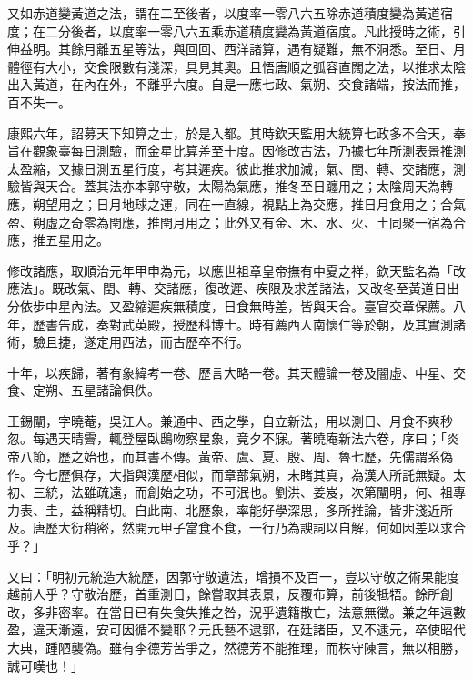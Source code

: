 \begin{pinyinscope}
又如赤道變黃道之法，謂在二至後者，以度率一零八六五除赤道積度變為黃道宿度；在二分後者，以度率一零八六五乘赤道積度變為黃道宿度。凡此授時之術，引伸益明。其餘月離五星等法，與回回、西洋諸算，遇有疑難，無不洞悉。至日、月體徑有大小，交食限數有淺深，具見其奧。且悟唐順之弧容直闊之法，以推求太陰出入黃道，在內在外，不離乎六度。自是一應七政、氣朔、交食諸端，按法而推，百不失一。

康熙六年，詔募天下知算之士，於是入都。其時欽天監用大統算七政多不合天，奉旨在觀象臺每日測驗，而金星比算差至十度。因修改古法，乃據七年所測表景推測太盈縮，又據日測五星行度，考其遲疾。彼此推求加減，氣、閏、轉、交諸應，測驗皆與天合。蓋其法亦本郭守敬，太陽為氣應，推冬至日躔用之；太陰周天為轉應，朔望用之；日月地球之運，同在一直線，視點上為交應，推日月食用之；合氣盈、朔虛之奇零為閏應，推閏月用之；此外又有金、木、水、火、土同聚一宿為合應，推五星用之。

修改諸應，取順治元年甲申為元，以應世祖章皇帝撫有中夏之祥，欽天監名為「改應法」。既改氣、閏、轉、交諸應，復改遲、疾限及求差諸法，又改冬至黃道日出分依步中星內法。又盈縮遲疾無積度，日食無時差，皆與天合。臺官交章保薦。八年，歷書告成，奏對武英殿，授歷科博士。時有薦西人南懷仁等於朝，及其實測諸術，驗且捷，遂定用西法，而古歷卒不行。

十年，以疾歸，著有象緯考一卷、歷言大略一卷。其天體論一卷及闇虛、中星、交食、定朔、五星諸論俱佚。

王錫闡，字曉菴，吳江人。兼通中、西之學，自立新法，用以測日、月食不爽秒忽。每遇天晴霽，輒登屋臥鴟吻察星象，竟夕不寐。著曉庵新法六卷，序曰；「炎帝八節，歷之始也，而其書不傳。黃帝、虞、夏、殷、周、魯七歷，先儒謂系偽作。今七歷俱存，大指與漢歷相似，而章蔀氣朔，未睹其真，為漢人所託無疑。太初、三統，法雖疏遠，而創始之功，不可泯也。劉洪、姜岌，次第闡明，何、祖專力表、圭，益稱精切。自此南、北歷象，率能好學深思，多所推論，皆非淺近所及。唐歷大衍稍密，然開元甲子當食不食，一行乃為諛詞以自解，何如因差以求合乎？」

又曰：「明初元統造大統歷，因郭守敬遺法，增損不及百一，豈以守敬之術果能度越前人乎？守敬治歷，首重測日，餘嘗取其表景，反覆布算，前後牴牾。餘所創改，多非密率。在當日已有失食失推之咎，況乎遺籍散亡，法意無徵。兼之年遠數盈，違天漸遠，安可因循不變耶？元氏藝不逮郭，在廷諸臣，又不逮元，卒使昭代大典，踵陋襲偽。雖有李德芳苦爭之，然德芳不能推理，而株守陳言，無以相勝，誠可嘆也！」


\end{pinyinscope}
